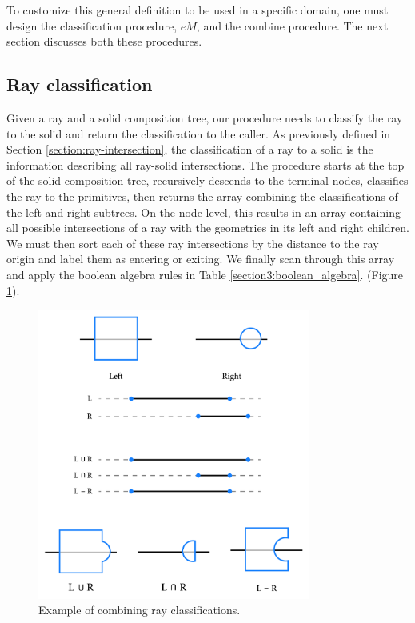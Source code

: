 \documentclass[a4paper,11pt,oneside]{article}
\begin{document}
To customize this general definition to be used in a specific domain, one must design the classification procedure, $eM$, and the combine procedure. The next section discusses both these procedures.

\subsection{Ray classification}
\label{sec3.3:ray-classification}

Given a ray and a solid composition tree, our procedure needs to classify the ray to the solid and return the classification to the caller. As previously defined in Section \ref{section:ray-intersection}, the classification of a ray to a solid is the information describing all ray-solid intersections. The procedure starts at the top of the solid composition tree, recursively descends to the terminal nodes, classifies the ray to the primitives, then returns the array combining the classifications of the left and right subtrees. On the node level, this results in an array containing all possible intersections of a ray with the geometries in its left and right children. We must then sort each of these ray intersections by the distance to the ray origin and label them as entering or exiting. We finally scan through this array and apply the boolean algebra rules in Table \ref{section3:boolean_algebra}. (Figure \ref{sec3.3:classification}).
\begin{figure}[ht]
	\begin{center}
		\includegraphics[width=0.8\textwidth]{section3/3.3/ray-classifications.png}
	\end{center}
	\caption{Example of combining ray classifications.}
	\label{sec3.3:classification}
\end{figure}
\end{document}
